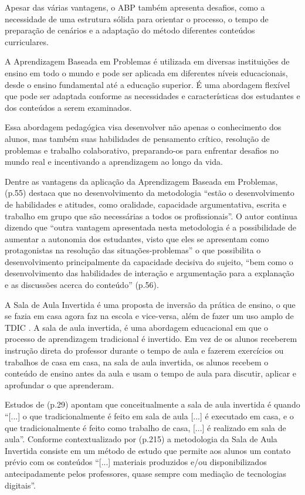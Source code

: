 Apesar das várias vantagens, o ABP também apresenta desafios, como a necessidade de uma estrutura sólida para orientar o processo, o tempo de preparação de cenários e a adaptação do método diferentes conteúdos curriculares.

A Aprendizagem Baseada em Problemas é utilizada em diversas instituições de ensino em todo o mundo e pode ser aplicada em diferentes níveis educacionais, desde o ensino fundamental até a educação superior. É uma abordagem flexível que pode ser adaptada conforme as necessidades e características dos estudantes e dos conteúdos a serem examinados.

Essa abordagem pedagógica visa desenvolver não apenas o conhecimento dos alunos, mas também suas habilidades de pensamento crítico, resolução de problemas e trabalho colaborativo, preparando-os para enfrentar desafios no mundo real e incentivando a aprendizagem ao longo da vida.

Dentre as vantagens da aplicação da Aprendizagem Baseada em Problemas,  (p.55) destaca que no desenvolvimento da metodologia ``estão o desenvolvimento de habilidades e atitudes, como oralidade, capacidade argumentativa, escrita e trabalho em grupo que são necessárias a todos os profissionais''. O autor continua dizendo que ``outra vantagem apresentada nesta metodologia é a possibilidade de aumentar a autonomia dos estudantes, visto que eles se apresentam como protagonistas na resolução das situações-problemas'' o que possibilita o desenvolvimento principalmente da capacidade decisiva do sujeito, ``bem como o desenvolvimento das habilidades de interação e argumentação para a explanação e as discussões acerca do conteúdo'' (p.56).

A Sala de Aula Invertida é uma proposta de inversão da prática de ensino, o que se fazia em casa agora faz na escola e vice-versa, além de fazer um uso amplo de TDIC \cite{BERGMANNSANS2016}. A sala de aula invertida, é uma abordagem educacional em que o processo de aprendizagem tradicional é invertido. Em vez de os alunos receberem instrução direta do professor durante o tempo de aula e fazerem exercícios ou trabalhos de casa em casa, na sala de aula invertida, os alunos recebem o conteúdo de ensino antes da aula e usam o tempo de aula para discutir, aplicar e aprofundar o que aprenderam.

Estudos de  (p.29) apontam que conceitualmente a sala de aula invertida é quando ``[...] o que tradicionalmente é feito em sala de aula [...] é executado em casa, e o que tradicionalmente é feito como trabalho de casa, [...] é realizado em sala de aula''. Conforme contextualizado por  (p.215) a metodologia da Sala de Aula Invertida consiste em um método de estudo que permite aos alunos um contato prévio com os conteúdos ``[...] materiais produzidos e/ou disponibilizados antecipadamente pelos professores, quase sempre com mediação de tecnologias digitais''.

